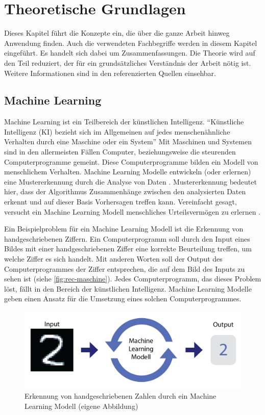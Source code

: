 \chapter{Theoretische Grundlagen}\label{chap:t}
Dieses Kapitel führt die Konzepte ein, die über die ganze Arbeit hinweg
Anwendung finden. Auch die verwendeten Fachbegriffe werden in diesem Kapitel
eingeführt. Es handelt sich dabei um Zusammenfassungen. Die Theorie wird auf den
Teil reduziert, der für ein grundsätzliches Verständnis der Arbeit nötig ist.
Weitere Informationen sind in den referenzierten Quellen einsehbar.

\section{Machine Learning}\label{chap:t_ml}
Machine Learning ist ein Teilbereich der künstlichen Intelligenz. ``Künstliche
Intelligenz (KI) bezieht sich im Allgemeinen auf jedes menschenähnliche
Verhalten durch eine Maschine oder ein System'' \cite{noauthor_what_nodate} Mit
Maschinen und Systemen sind in den allermeisten Fällen Computer, beziehungsweise
die steurenden Computerprogramme gemeint. Diese Computerprogramme bilden ein
Modell von menschlichem Verhalten. Machine Learning Modelle entwickeln (oder
erlernen) eine Mustererkennung durch die Analyse von Daten
\cite{noauthor_what_nodate-1}. Mustererkennung bedeutet hier, dass der
Algorithmus Zusammenhänge zwischen den analysierten Daten erkennt und auf dieser
Basis Vorhersagen treffen kann. Vereinfacht gesagt, versucht ein Machine
Learning Modell menschliches Urteilsvermögen zu erlernen
\cite{spaulding_is_2020}.

Ein Beispielproblem für ein Machine Learning Modell ist die Erkennung von
handgeschriebenen Ziffern. Ein Computerprogramm soll durch den Input eines
Bildes mit einer handgeschriebenen Ziffer eine korrekte Beurteilung treffen, um
welche Ziffer es sich handelt. Mit anderen Worten soll der Output des
Computerprogrammes der Ziffer entsprechen, die auf dem Bild des Inputs zu sehen
ist (siehe \autoref{fig:rec-maschine}). Jedes Computerprogramm, das dieses
Problem löst, fällt in den Bereich der künstlichen Intelligenz. Machine Learning
Modelle geben einen Ansatz für die Umsetzung eines solchen Computerprogrammes.

\begin{figure}[!ht]
    \centering
    \includegraphics[width=\textwidth]{images/theorie/rec-maschine.png}
    \caption{Erkennung von handgeschriebenen Zahlen durch ein Machine Learning Modell (eigene Abbildung)}
    \label{fig:rec-maschine}
\end{figure}

